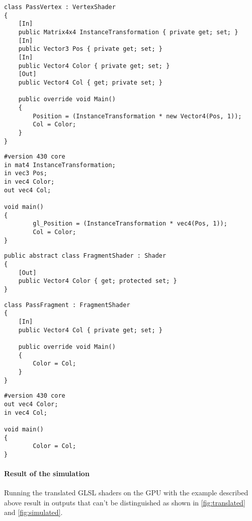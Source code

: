 \begin{lstlisting}[caption = {Vertex shader written in C\#}, label = {lst:sharpVertex}]
class PassVertex : VertexShader
{
    [In]
    public Matrix4x4 InstanceTransformation { private get; set; }
    [In]
    public Vector3 Pos { private get; set; }
    [In]
    public Vector4 Color { private get; set; }
    [Out]
    public Vector4 Col { get; private set; }
    
    public override void Main()
    {
        Position = (InstanceTransformation * new Vector4(Pos, 1));
        Col = Color;
    }
}
\end{lstlisting}

\begin{lstlisting}[caption = {Vertex shader translated in GLSL}, label = {lst:outputVertex}]
#version 430 core
in mat4 InstanceTransformation;
in vec3 Pos;
in vec4 Color;
out vec4 Col;

void main()
{
        gl_Position = (InstanceTransformation * vec4(Pos, 1));
        Col = Color;
}
\end{lstlisting}

\newpage

\begin{lstlisting}[caption = {Base class of a fragment shader in C\#}, label = {lst:fragmentBase}]
public abstract class FragmentShader : Shader
{
    [Out]
    public Vector4 Color { get; protected set; }
}
\end{lstlisting}

\begin{lstlisting}[caption = {Fragment shader written in C\#}, label = {lst:sharpFragment}]
class PassFragment : FragmentShader
{
    [In]
    public Vector4 Col { private get; set; }
    
    public override void Main()
    {
        Color = Col;
    }
}
\end{lstlisting}

\begin{lstlisting}[caption = {Fragment shader translated in GLSL}, label = {lst:outputFragment}]
#version 430 core
out vec4 Color;
in vec4 Col;

void main()
{
        Color = Col;
}
\end{lstlisting}

\paragraph{Result of the simulation}

Running the translated GLSL shaders on the GPU with the example described above result in outputs that can't be distinguished as shown in \autoref{fig:translated} and \autoref{fig:simulated}.

